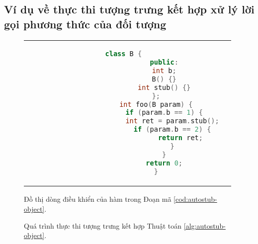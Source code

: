 \subsection{Ví dụ về thực thi tượng trưng kết hợp xử lý lời gọi phương thức của đối tượng}
\begin{figure}[ht]
	\begin{tabular}{cc}
		\begin{minipage}[b]{0.5\textwidth}
			\begin{lstlisting}[language=C++, caption={Mã nguồn minh họa phương pháp tạo stub tự động cho phương thức của đối tượng.}, label={cod:autostub-object}, captionpos=b]
				class B {
					public:
					int b;
					B() {}
					int stub() {}
				};
				int foo(B param) {
					if (param.b == 1) {
						int ret = param.stub();
						if (param.b == 2) {
							return ret;
						}
					}
					return 0;
				}
			\end{lstlisting}
		\end{minipage}
		& \begin{minipage}[b]{0.4\textwidth}
			\centering
			
			\caption{Đồ thị dòng điều khiển của hàm \tcode{foo(B param)} trong Đoạn mã \ref{cod:autostub-object}.}
			\label{fig:cfg-object}
		\end{minipage}
	\end{tabular}
\end{figure}
\begin{figure}[h]
	\centering
	
	\caption{Quá trình thực thi tượng trưng kết hợp Thuật toán \ref{alg:autostub-object}.}
	\label{fig:autostub-sample}
\end{figure}

